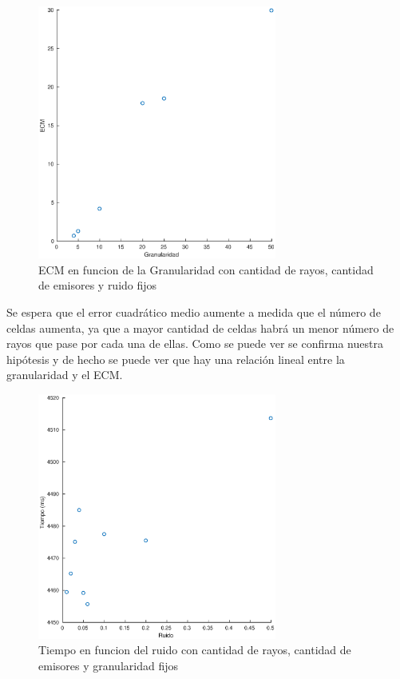 \begin{figure}[H]
	\centering	\includegraphics[width=0.7\textwidth]{img/granu_ecm}
	\caption{ECM en funcion de la Granularidad con cantidad de rayos, cantidad de emisores y ruido fijos}
	\label{fig:granu_ecm}
\end{figure}
Se espera que el error cuadrático medio aumente a medida que el número de celdas aumenta, ya que a mayor cantidad de celdas habrá un menor número de rayos que pase por cada una de ellas. Como se puede ver se confirma nuestra hipótesis y de hecho se puede ver que hay una relación lineal entre la granularidad y el ECM.

\begin{figure}[H]
	\centering	\includegraphics[width=0.7\textwidth]{img/ruido_tiempo}
	\caption{Tiempo en funcion del ruido con cantidad de rayos, cantidad de emisores y granularidad fijos}
	\label{fig:ruido_tiempo}
\end{figure}

